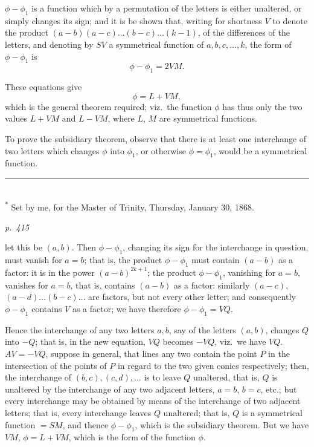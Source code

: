 \documentclass[11pt,a4paper]{article}
\theoremstyle{plain}
\theoremstyle{definition}
\begin{document}
$\phi - \phi_1$ is a function which by a permutation of the letters is either unaltered, or
simply changes its sign; and it is be shown that, writing for shortness $V$ to denote
the product $(a - b)(a - c) \ldots (b - c) \ldots (k - 1)$, of the differences of the letters, and denoting
by $S V$ a symmetrical function of $a, b, c, \ldots, k$, the form of $\phi - \phi_1$ is
\[
\phi - \phi_1 = 2 V M.
\]

These equations give
\[
\phi = L + V M,
\]
which is the general theorem required; viz.\ the function $\phi$ has thus only the two
values $L + V M$ and $L - V M$, where $L$, $M$ are symmetrical functions.

To prove the subsidiary theorem, observe that there is at least one interchange of
two letters which changes $\phi$ into $\phi_1$, or otherwise $\phi = \phi_1$, would be a symmetrical function.

\noindent\rule{0.45\textwidth}{0.4pt}\\
\footnotesize\textsuperscript{*} Set by me, for the Master of Trinity, Thursday, January 30, 1868.\normalsize

\clearpage

\bigskip
\textit{p.~415}
\smallskip

\noindent
let this be $(a, b)$. Then $\phi - \phi_1$, changing its sign for the interchange in question, must
vanish for $a = b$; that is, the product $\phi - \phi_1$ must contain $(a - b)$ as a factor: it is
in the power $(a - b)^{2k+1}$; the product $\phi - \phi_1$, vanishing for $a = b$, vanishes for $a = b$,
that is, contains $(a - b)$ as a factor: similarly $(a - c)$, $(a - d) \ldots (b - c) \ldots$ are factors, but
not every other letter; and consequently $\phi - \phi_1$ contains $V$ as a factor; we have therefore
$\phi - \phi_1 = V Q$.

Hence the interchange of any two letters $a, b$, say of the letters $(a, b)$, changes
$Q$ into $- Q$; that is, in the new equation, $V Q$ becomes $- V Q$, viz.\ we have $V Q$.
$A V = - V Q$, suppose in general, that lines any two contain the point $P$ in the
intersection of the points of $P$ in regard to the two given conics respectively; then,
the interchange of $(b, c), (c, d), \ldots$ is to leave $Q$ unaltered, that is, $Q$ is unaltered by
the interchange of any two adjacent letters, $a = b$, $b = c$, etc.; but every interchange may be
obtained by means of the interchange of two adjacent letters; that is, every interchange
leaves $Q$ unaltered; that is, $Q$ is a symmetrical function $= S M$, and thence $\phi - \phi_1$,
which is the subsidiary theorem.  But we have $V M$, $\phi = L + V M$, which is the
form of the function $\phi$.
\end{document}
